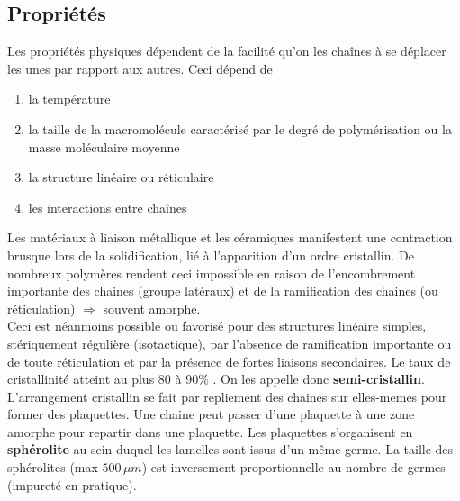 	\subsection{Propriétés}
		Les propriétés physiques dépendent de la facilité qu'on les chaînes à se déplacer les unes par rapport aux autres. Ceci dépend de 
		\begin{enumerate}
			\item la température
			\item la taille de la macromolécule caractérisé par le degré de polymérisation ou la masse moléculaire moyenne
			\item la structure linéaire ou réticulaire
			\item les interactions entre chaînes
		\end{enumerate}
		Les matériaux à liaison métallique et les céramiques manifestent une contraction brusque lors de la solidification, lié à l'apparition d'un ordre cristallin. De nombreux polymères rendent ceci impossible en raison de l'encombrement importante des chaines (groupe latéraux) et de la ramification des chaines (ou réticulation) $\Rightarrow$ souvent amorphe. \\
		Ceci est néanmoins possible ou favorisé pour des structures linéaire simples, stériquement régulière (isotactique), par l'absence de ramification importante ou de toute réticulation et par la présence de fortes liaisons secondaires. Le taux de cristallinité atteint au plus 80 à 90\% . On les appelle donc \textbf{semi-cristallin}.  L'arrangement cristallin se fait par repliement des chaines sur elles-memes pour former des plaquettes. Une chaine peut passer d'une plaquette à une zone amorphe pour repartir dans une plaquette. Les plaquettes s'organisent en \textbf{sphérolite} au sein duquel les lamelles sont issus d'un même germe. La taille des sphérolites (max $500\, \mu m$) est inversement proportionnelle au nombre de germes (impureté en pratique). 
		
